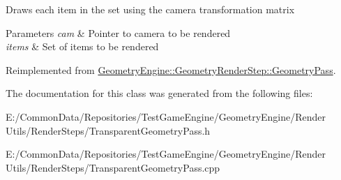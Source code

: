 Draws each item in the set using the camera transformation matrix 
\begin{DoxyParams}{Parameters}
{\em cam} & Pointer to camera to be rendered \\
\hline
{\em items} & Set of items to be rendered \\
\hline
\end{DoxyParams}


Reimplemented from \mbox{\hyperlink{class_geometry_engine_1_1_geometry_render_step_1_1_geometry_pass_a2929c4675eb93efd992739baac565425}{Geometry\+Engine\+::\+Geometry\+Render\+Step\+::\+Geometry\+Pass}}.



The documentation for this class was generated from the following files\+:\begin{DoxyCompactItemize}
\item 
E\+:/\+Common\+Data/\+Repositories/\+Test\+Game\+Engine/\+Geometry\+Engine/\+Render Utils/\+Render\+Steps/Transparent\+Geometry\+Pass.\+h\item 
E\+:/\+Common\+Data/\+Repositories/\+Test\+Game\+Engine/\+Geometry\+Engine/\+Render Utils/\+Render\+Steps/Transparent\+Geometry\+Pass.\+cpp\end{DoxyCompactItemize}
